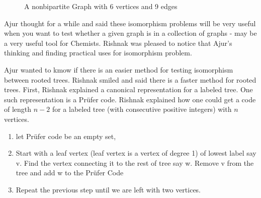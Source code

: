 \begin{figure}

\caption{ A nonbipartite Graph with 6 vertices and 9 edges}\label{8g4}

\end{figure}

Ajur thought for a while and said these isomorphism problems will be very useful when you want to test whether a given graph is in a collection of graphs - may be a very useful tool for Chemists. Rishnak was pleased to notice that Ajur's thinking and finding practical uses for isomorphism problem. 

Ajur wanted to kmow if there is an easier method for testing isomorphism between rooted trees. Rishnak smiled and said there is a faster method for rooted trees. First, Rishnak explained a canonical representation for a labeled tree. One such representation is a Pr{\"u}fer code. Rishnak explained how one could get a code of length $n-2$ for a labeled tree (with consecutive positive integers) with  $n$ vertices.

\begin{enumerate}
\item let Pr{\"u}fer code be an empty set,

\item Start with a leaf vertex (leaf vertex is a vertex of degree 1) of lowest label say v. Find the vertex connecting it to the rest of tree say w.  Remove v from the tree and add w to the Pr{\"u}fer Code
 
\item Repeat the previous step until we are left with two vertices.
\end{enumerate}

